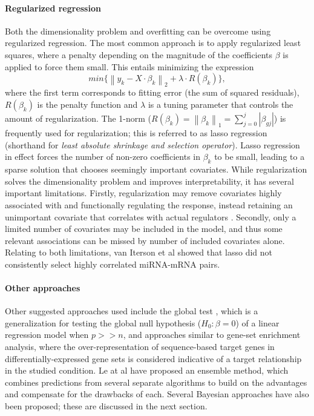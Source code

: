 \paragraph{Regularized regression}
Both the dimensionality problem and overfitting can be overcome using regularized
regression. The most common approach is to apply regularized least squares,
where a penalty depending on the magnitude of the coefficients $\beta$
is applied to force them small. This entails minimizing the expression
\begin{equation}
	min\{ \left \| y_k - X \cdot \beta_k \right \|_2 + \lambda \cdot R(\beta_k) \} ,
\end{equation}
where the first term corresponds to fitting error (the sum of squared residuals),
$R(\beta_k)$ is the penalty function and $\lambda$ is a tuning
parameter that controls the amount of regularization. 
The 1-norm ($R(\beta_k) = \left \| \beta_k \right \|_1 = \sum_{j=0}^{j} \left | \beta_{gj} \right |$)
is frequently used for regularization; this is referred to as lasso regression
(shorthand for \emph{least absolute shrinkage and selection operator}).
Lasso regression in effect forces the number of non-zero coefficients in $\beta_k$
to be small, leading to a sparse solution that chooses seemingly important covariates.
While regularization solves the dimensionality problem and improves
interpretability, it has several important limitations. Firstly, regularization
may remove covariates highly associated with and functionally regulating the
response, instead retaining an unimportant covariate that correlates with
actual regulators \citep{Engelmann2012}. Secondly, only a limited number of
covariates may be included in the model, and thus some relevant associations
can be missed by number of included covariates alone.%
Relating to both limitations, van Iterson et al \citep{vanIterson2013} showed that
lasso did not consistently select highly correlated miRNA-mRNA pairs.

\paragraph{Other approaches}
Other suggested approaches used include the global test \citep{vanIterson2013}, which is a
generalization for testing the global null hypothesis ($H_0: \beta = 0$) of a
linear regression model when $p >> n$, and approaches
similar to gene-set enrichment analysis, where the over-representation of
sequence-based target genes in differentially-expressed gene sets is considered
indicative of a target relationship in the studied condition. Le at al \citep{Le2015}
have proposed an ensemble
method, which combines predictions from several separate algorithms to build
on the advantages and compensate for the drawbacks of each.
Several Bayesian approaches have also been proposed; these are discussed in
the next section.


